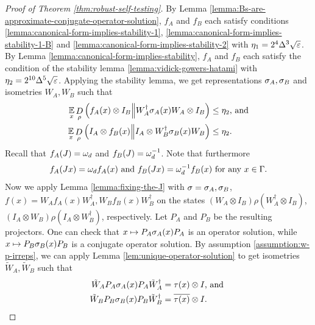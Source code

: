 \begin{proof}[Proof of Theorem \ref{thm:robust-self-testing}]
	By Lemma \ref{lemma:Bs-are-approximate-conjugate-operator-solution}, $f_A$ and $f_B$ each satisfy conditions \eqref{lemma:canonical-form-implies-stability-1}, \eqref{lemma:canonical-form-implies-stability-1-B} and \eqref{lemma:canonical-form-implies-stability-2} 
	with $\eta_1 = 2^4\Delta^3\sqrt {\varepsilon}$. By Lemma \ref{lemma:canonical-form-implies-stability}, $f_A$ and $f_B$ each satisfy the condition of the stability lemma \ref{lemma:vidick-gowers-hatami} with $\eta_2 =2^{10}\Delta^5\sqrt{\varepsilon}$. Applying the stability lemma, we get representations $\sigma_A,\sigma_B$ and isometries $W_A,W_B$ such that 
	\begin{align}
	\label{eq:fa-close-to-something}
		\operatorname*{\mathbb E}\limits_{x} \mathop{D}\limits_{\rho}\left(f_A(x)\otimes I_B\middle\|  W_A^\dagger \sigma_A(x)W_A\otimes I_B\right) &\leq \eta_2\text{, and} \\
		\operatorname*{\mathbb E}\limits_{x} \mathop{D}\limits_{\rho}\left(I_A\otimes f_B(x)\middle\|  I_A \otimes  W_B^\dagger \sigma_B(x)W_B\right) &\leq \eta_2. 
	\end{align}
	Recall that $f_A(J) = \omega_d$ and $f_B(J) = \omega_d^{-1}$. Note that furthermore 
	\begin{equation}
		f_A(Jx) = \omega_df_A(x)\text{ and } f_B(Jx) = \omega_d^{-1}f_B(x)\text{ for any }x\in\Gamma.
	\end{equation}
	Now we apply Lemma \ref{lemma:fixing-the-J} with $\sigma=\sigma_A,\sigma_B$, $f(x) = W_Af_A(x)W_A^\dagger, W_Bf_B(x)W_B^\dagger$ on the states $(W_A\otimes I_B)\rho (W_A^\dagger \otimes I_B)$,$(I_A\otimes W_B)\rho (I_A\otimes W_B^\dagger)$, respectively. Let $P_A$ and $P_B$ be the resulting projectors. One can check that $x \mapsto P_A\sigma_A(x)P_A$ is an operator solution, while  $x \mapsto P_B\sigma_B(x)P_B$ is a conjugate operator solution. By assumption \eqref{assumption:w-p-irreps}, we can apply Lemma \ref{lem:unique-operator-solution} to get isometries ${\tilde W}_A, {\tilde W}_B$ such that
	\begin{align} 
	\label{eq:tau-construction-by-isometry}
	{\tilde W}_AP_A\sigma_A(x)P_A{\tilde W}_A^\dagger &= \tau(x)\otimes I\text{, and }
	\\
	{\tilde W}_BP_B\sigma_B(x)P_B{\tilde W}_B^\dagger &= \overline{\tau(x)}\otimes I.
	\end{align}


\end{proof}
